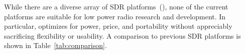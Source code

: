 \begin{comment}
		USRP E100~{\small \cite{usrp:e100}}& 5.5~W	& 9\realtilde15~W		 & 1760~cm$^{3}$		& OMAP 3 GPMC & 1.3~Gb/s	& \$1300	 & Commercial \\ \hline
		\rowcolor[gray]{.9}
		\sdr	 & 0.32~W	& 1.4~W			 & 182~cm$^{3}$	& AMBA		& 1.4~Gb/s	& \$150\tnote{h}	 & Research \\ \hline
	\end{tabular}
	\begin{tablenotes}
		\small
		\item [a] Memory bus architecture not specified in~\cite{soda}.
		\item [b] Inferred minimum, may be faster.
		\item [c] Requires a companion PC. Not factored in power, portability, or cost for the USRP 1/2.
		\item [d] SODA is a custom chip that would likely have an extremely high die cost, but low per-unit cost.
		\item [e] Assumes $1mm$ thick.
		\item [f] Assumes $2cm$ thick.
		\item [g] ``Multi-Gigabit Transceiver'', an interconnect technology built into Xilinx FPGAs. Uses up to 8 parallel 3~Gb/s transceivers
		\item [h] Assumes 1,000 unit production run. See Table~\ref{tab:cost} for detailed breakdown.
	\end{tablenotes}
	\caption{A comparison of SDR platforms. The range in power comes from
boards whose power usage varies depending on the presence and type of daughter
card installed in the system. Where possible a measured idle / sleep power is
also shown.  For platforms that only list area we make reasonable assumptions
on height. \sdr is 10\% the cost of the next most expensive SDR platform, yet
provides parable speeds in the smallest non-IC package. It uses less power
than any realized hardware and nearly ties the previous best theoretical
hardware.}
	\label{tab:comparison}
\end{threeparttable}
\end{table*}
\end{comment}

While there are a diverse array of SDR platforms~(\cite{warp-platform,
  soda, kuar, sora}), none of the current platforms are suitable for low
power radio research and development. In particular, \sdr optimizes
for power, price, and portability without appreciably sacrificing
flexibility or usability. A comparison to previous SDR platforms is
shown in Table~\ref{tab:comparison}.

